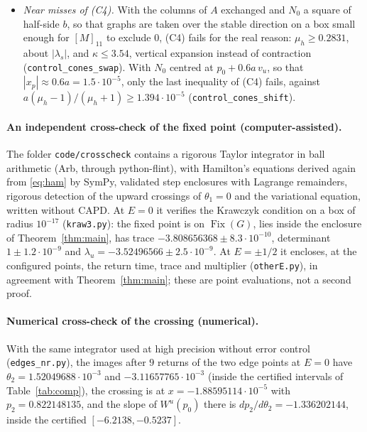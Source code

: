 \documentclass[11pt]{article}
\theoremstyle{definition}
\newcommand{\Fix}{\operatorname{Fix}}
\begin{document}
\begin{itemize}
\item \emph{Near misses of (C4).} With the columns of $A$ exchanged and $N_0$ a square of half-side $b$, so that graphs are taken over the stable direction on a box small enough for $[M]_{11}$ to exclude $0$, (C4) fails for the real reason: $\mu_h \ge 0.2831$, about $|\lambda_s|$, and $\kappa \le 3.54$, vertical expansion instead of contraction (\texttt{control\_cones\_swap}). With $N_0$ centred at $p_0 + 0.6a\,v_u$, so that $|x_p| \approx 0.6a = 1.5\cdot10^{-5}$, only the last inequality of (C4) fails, against $a(\mu_h - 1)/(\mu_h + 1) \ge 1.394\cdot10^{-5}$ (\texttt{control\_cones\_shift}).
\end{itemize}

\paragraph{An independent cross-check of the fixed point (computer-assisted).} The folder \texttt{code/crosscheck} contains a rigorous Taylor integrator in ball arithmetic (Arb, through python-flint), with Hamilton's equations derived again from \eqref{eq:ham} by SymPy, validated step enclosures with Lagrange remainders, rigorous detection of the upward crossings of $\theta_1 = 0$ and the variational equation, written without CAPD. At $E = 0$ it verifies the Krawczyk condition on a box of radius $10^{-17}$ (\texttt{kraw3.py}): the fixed point is on $\Fix(G)$, lies inside the enclosure of Theorem~\ref{thm:main}, has trace $-3.808656368 \pm 8.3\cdot10^{-10}$, determinant $1 \pm 1.2\cdot10^{-9}$ and $\lambda_u = -3.52496566 \pm 2.5\cdot10^{-9}$. At $E = \pm1/2$ it encloses, at the configured points, the return time, trace and multiplier (\texttt{otherE.py}), in agreement with Theorem~\ref{thm:main}; these are point evaluations, not a second proof.

\paragraph{Numerical cross-check of the crossing (numerical).} With the same integrator used at high precision without error control (\texttt{edges\_nr.py}), the images after $9$ returns of the two edge points at $E = 0$ have $\theta_2 = 1.52049688\cdot10^{-3}$ and $-3.11657765\cdot10^{-3}$ (inside the certified intervals of Table~\ref{tab:comp}), the crossing is at $x = -1.88595114\cdot10^{-5}$ with $p_2 = 0.822148135$, and the slope of $W^u(p_0)$ there is $dp_2/d\theta_2 = -1.336202144$, inside the certified $[-6.2138, -0.5237]$.
\end{document}
